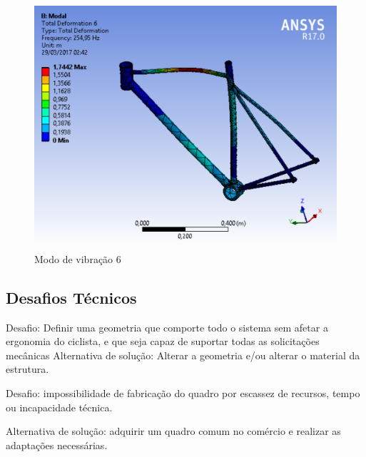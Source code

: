 \graphicspath{{figuras/}}
	\begin{figure}[h!]
	\centering
	\includegraphics[scale=0.80]{modo_de_vibracao_6.png}
	\caption{Modo de vibração 6}
	\label{img:modo_de_vibracao 6}
	\end{figure}	

\clearpage

	
	
	
	\subsection{Desafios Técnicos}
	Desafio: Definir uma geometria que comporte todo o sistema sem afetar a ergonomia do ciclista, e que seja capaz de suportar todas as solicitações mecânicas
Alternativa de solução: Alterar a geometria e/ou alterar o material da estrutura.

Desafio: impossibilidade de fabricação do quadro  por escassez de recursos, tempo ou incapacidade técnica.

Alternativa de solução: adquirir um quadro comum no comércio e realizar as adaptações necessárias.

